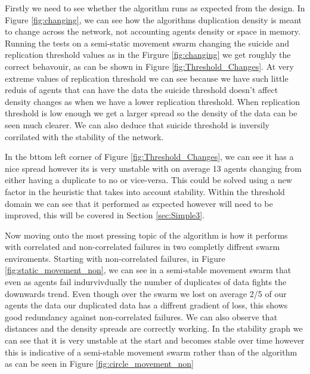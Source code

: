 \documentclass{UoYCSproject}
\begin{document}
Firstly we need to see whether the algorithm runs as expected from the design.
In Figure \ref{fig:changing}, we can see how the algorithms duplication density is meant to change across the network, not accounting agents density or space in memory.
Running the tests on a semi-static movement swarm changing the suicide and replication threshold values as in the Firgure \ref{fig:changing} we get roughly the correct behavouir, as can be shown in Figure \ref{fig:Threshold_Changes}.
At very extreme values of replication threshold we can see because we have such little reduis of agents that can have the data the suicide threshold doesn't affect density changes as when we have a lower replication threshold.
When replication threshold is low enough we get a larger spread so the density of the data can be seen much clearer.
We can also deduce that suicide threshold is inversily corrilated with the stability of the network.

In the bttom left corner of Figure \ref{fig:Threshold_Changes}, we can see it has a nice spread however its is very unstable with on average 13 agents changing from either having a duplicate to no or vice-versa.
This could be solved using a new factor in the heuristic that takes into account stability.
Within the threshold domain we can see that it performed as expected however will need to be improved, this will be covered in Section \ref{sec:Simple3}.

Now moving onto the most pressing topic of the algorithm is how it performs with correlated and non-correlated failures in two completly diffrent swarm enviroments.
Starting with non-correlated failures, in Figure \ref{fig:static_movement_non}, we can see in a semi-stable movement swarm that even as agents fail indurvivdually the number of duplicates of data fights the downwards trend.
Even though over the swarm we lost on average 2/5 of our agents the data our duplicated data has a diffrent gradient of loss, this shows good redundancy against non-correlated failures.
We can also observe that distances and the density spreads are correctly working.
In the stability graph we can see that it is very unstable at the start and becomes stable over time however this is indicative of a semi-stable movement swarm rather than of the algorithm as can be seen in Figure \ref{fig:circle_movement_non}
\end{document}

